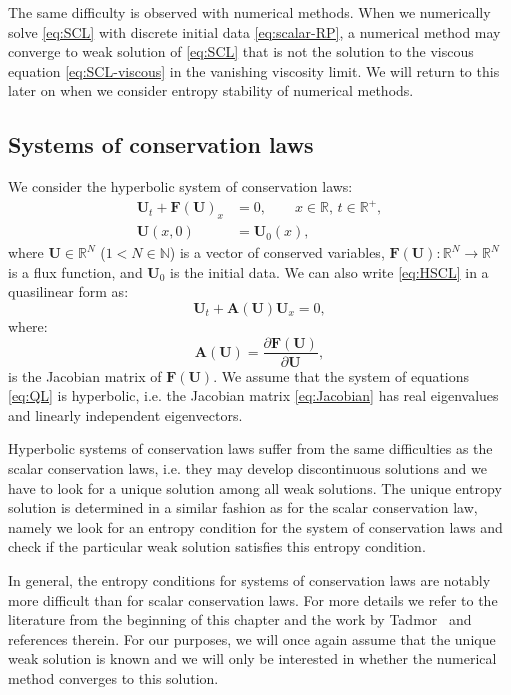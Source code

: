 The same difficulty is observed with numerical methods. When we numerically solve \eqref{eq:SCL} with discrete initial data \eqref{eq:scalar-RP}, a numerical method may converge to weak solution of \eqref{eq:SCL} that is not the solution to the viscous equation \eqref{eq:SCL-viscous} in the vanishing viscosity limit. We will return to this later on when we consider entropy stability of numerical methods.

\subsection{Systems of conservation laws}

We consider the hyperbolic system of conservation laws:
\begin{subequations} \label{eq:HSCL}
\begin{align}
\mathbf{U}_t + \mathbf{F(U)}_x & = 0, \qquad x \in \mathbb{R}, \, t \in \mathbb{R}^+, \\
\mathbf{U}(x,0) & = \mathbf{U}_0(x),
\end{align}
\end{subequations}
where $ \mathbf{U} \in \mathbb{R}^N $ ($ 1<N \in \mathbb{N} $) is a vector of conserved variables, \mbox{$ \mathbf{F(U)}: \mathbb{R}^N \rightarrow \mathbb{R}^N $} is a flux function, and $ \mathbf{U}_0 $ is the initial data. We can also write \eqref{eq:HSCL} in a quasilinear form as:
\begin{equation} \label{eq:QL}
\mathbf{U}_t + \mathbf{A(U)} \mathbf{U}_x = 0,
\end{equation}
where:
\begin{equation} \label{eq:Jacobian}
\mathbf{A(U)} = \frac{\partial \mathbf{F(U)}}{\partial \mathbf{U}},
\end{equation}
is the Jacobian matrix of $ \mathbf{F(U)} $. We assume that the system of equations \eqref{eq:QL} is hyperbolic, i.e. the Jacobian matrix \eqref{eq:Jacobian} has real eigenvalues and linearly independent eigenvectors.

Hyperbolic systems of conservation laws suffer from the same difficulties as the scalar conservation laws, i.e. they may develop discontinuous solutions and we have to look for a unique solution among all weak solutions. The unique entropy solution is determined in a similar fashion as for the scalar conservation law, namely we look for an entropy condition for the system of conservation laws and check if the particular weak solution satisfies this entropy condition. 

In general, the entropy conditions for systems of conservation laws are notably more difficult than for scalar conservation laws. For more details we refer to the literature from the beginning of this chapter and the work by Tadmor~\cite{tad86,tad87,tad03,tad16} and references therein. For our purposes, we will once again assume that the unique weak solution is known and we will only be interested in whether the numerical method converges to this solution.

